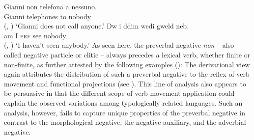 \documentclass[output=paper,biblatex,babelshorthands,newtxmath,draftmode,colorlinks,citecolor=brown]{langscibook}
\begin{document}
\begin{exe}
\begin{xlist}
\begin{exe}
\begin{xlist}
\eal
\ex \label{negation-position-1a}
\gll Gianni non telefona a nessuno.\\
     Gianni \NEG{} telephones to nobody\\ \hfill (, \citealt[]{Borsley:06})
\glt`Gianni does not call anyone.'
\ex \label{negation-position-1c}
\gll Dw i ddim wedi gweld neb.\\
     am I \NEG{} \textsc{prf} see nobody\\ \hfill  (, \citealt[]{Borsley:05})
\glt `I haven't seen anybody.'
\zl
%
%
As seen here,
the  preverbal negative \textit{non} -- also called negative particle or
clitic -- always precedes a lexical  verb, whether finite or
non-finite, as further attested by the following
examples (\citealp[Chapter~4]{Kim:00}):
%
\eal
{}
%
%
\zl
%
%
The derivational view again attributes the distribution of such a preverbal negative to the reflex
of verb movement and functional projections (see \citealt[Chapter~1]{Belletti:90}). This line of
analysis also appears to be persuasive in that the different scope of verb movement application
could explain the observed variations among typologically related languages. Such an analysis,
however, fails to capture unique properties of the preverbal negative in contrast to the
morphological negative, the negative auxiliary, and the adverbial negative.


\end{xlist}
\end{exe}
\end{xlist}
\end{exe}
\end{document}
